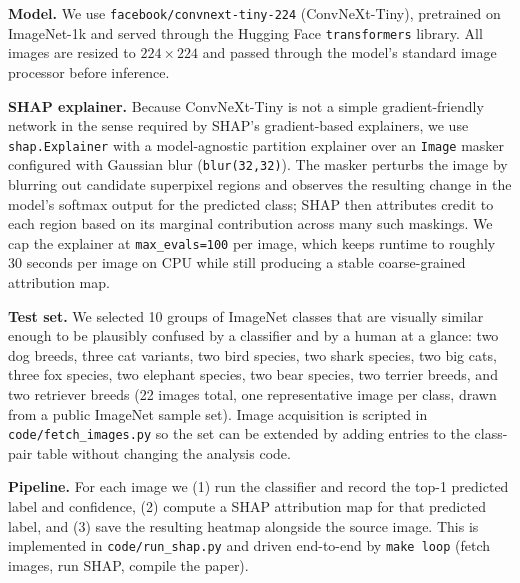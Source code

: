 \textbf{Model.} We use \texttt{facebook/convnext-tiny-224}
(ConvNeXt-Tiny), pretrained on ImageNet-1k and served through the Hugging
Face \texttt{transformers} library. All images are resized to
$224\times224$ and passed through the model's standard image processor
before inference.

\textbf{SHAP explainer.} Because ConvNeXt-Tiny is not a simple
gradient-friendly network in the sense required by SHAP's gradient-based
explainers, we use \texttt{shap.Explainer} with a model-agnostic partition
explainer over an \texttt{Image} masker configured with Gaussian blur
(\texttt{blur(32,32)}). The masker perturbs the image by blurring out
candidate superpixel regions and observes the resulting change in the
model's softmax output for the predicted class; SHAP then attributes
credit to each region based on its marginal contribution across many such
maskings. We cap the explainer at \texttt{max\_evals=100} per image, which
keeps runtime to roughly 30 seconds per image on CPU while still producing
a stable coarse-grained attribution map.

\textbf{Test set.} We selected 10 groups of ImageNet classes that are
visually similar enough to be plausibly confused by a classifier and by
a human at a glance: two dog breeds, three cat variants, two bird species,
two shark species, two big cats, three fox species, two elephant species,
two bear species, two terrier breeds, and two retriever breeds (22 images
total, one representative image per class, drawn from a public ImageNet
sample set). Image acquisition is scripted in
\texttt{code/fetch\_images.py} so the set can be extended by adding entries
to the class-pair table without changing the analysis code.

\textbf{Pipeline.} For each image we (1) run the classifier and record the
top-1 predicted label and confidence, (2) compute a SHAP attribution map
for that predicted label, and (3) save the resulting heatmap alongside the
source image. This is implemented in \texttt{code/run\_shap.py} and driven
end-to-end by \texttt{make loop} (fetch images, run SHAP, compile the
paper).

